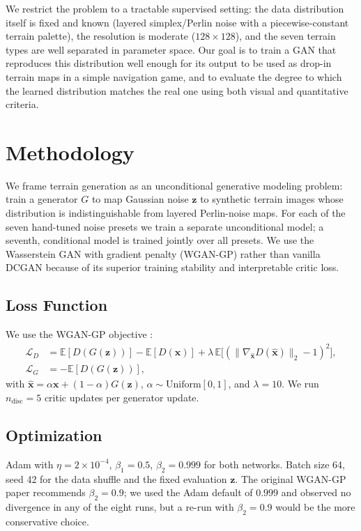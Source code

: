 \documentclass[11pt]{article}
\begin{document}
We restrict the problem to a tractable supervised setting: the data
distribution itself is fixed and known (layered simplex/Perlin noise with a
piecewise-constant terrain palette), the resolution is moderate
($128{\times}128$), and the seven terrain types are well separated in
parameter space. Our goal is to train a GAN that reproduces this distribution
well enough for its output to be used as drop-in terrain maps in a simple
navigation game, and to evaluate the degree to which the learned distribution
matches the real one using both visual and quantitative criteria.

\section{Methodology}
We frame terrain generation as an unconditional generative modeling problem:
train a generator $G$ to map Gaussian noise $\mathbf{z}$ to synthetic terrain
images whose distribution is indistinguishable from layered Perlin-noise maps.
For each of the seven hand-tuned noise presets we train a separate
unconditional model; a seventh, conditional model is trained jointly over all
presets. We use the Wasserstein GAN with gradient penalty (WGAN-GP)
\cite{gulrajani2017improved} rather than vanilla DCGAN
\cite{radford2016dcgan} because of its superior training stability and
interpretable critic loss.

\subsection{Loss Function}
We use the WGAN-GP objective \cite{gulrajani2017improved}:
\begin{align*}
\mathcal{L}_D &= \mathbb{E}[D(G(\mathbf{z}))] - \mathbb{E}[D(\mathbf{x})]
              + \lambda \,\mathbb{E}\big[(\|\nabla_{\hat{\mathbf{x}}}
                     D(\hat{\mathbf{x}})\|_2 - 1)^2\big], \\
\mathcal{L}_G &= -\mathbb{E}[D(G(\mathbf{z}))],
\end{align*}
with $\hat{\mathbf{x}} = \alpha \mathbf{x} + (1-\alpha) G(\mathbf{z})$,
$\alpha \sim \mathrm{Uniform}[0,1]$, and $\lambda = 10$. We run
$n_{\text{disc}} = 5$ critic updates per generator update.

\subsection{Optimization}
Adam with $\eta = 2{\times}10^{-4}$, $\beta_1 = 0.5$, $\beta_2 = 0.999$ for
both networks. Batch size 64, seed 42 for the data shuffle and the fixed
evaluation $\mathbf{z}$. The original WGAN-GP paper recommends
$\beta_2 = 0.9$; we used the Adam default of $0.999$ and observed no
divergence in any of the eight runs, but a re-run with $\beta_2 = 0.9$ would
be the more conservative choice.
\end{document}
